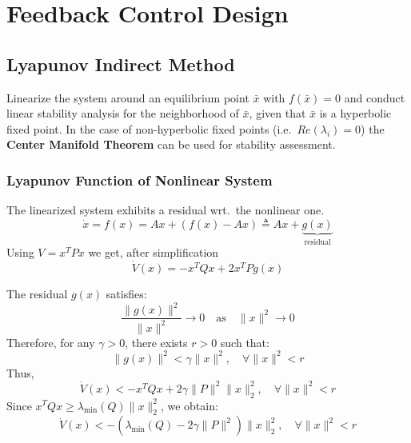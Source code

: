 \section{Feedback Control Design}
\subsection{Lyapunov Indirect Method}
Linearize the system around an equilibrium point $\bar{x}$ with $f(\bar{x})=0$ and conduct linear stability analysis for the neighborhood of $\bar{x}$, given that $\bar{x}$ is a hyperbolic fixed point.
\newpar{}
In the case of non-hyperbolic fixed points (i.e.\ $Re(\lambda_i)=0$) the \textbf{Center Manifold Theorem} can be used for stability assessment.

\subsubsection{Lyapunov Function of Nonlinear System}

The linearized system exhibits a residual wrt.\ the nonlinear one.
\begin{equation*}
    \dot{x} = f(x) = Ax + (f(x) - Ax) \triangleq Ax + \underbrace{g(x)}_{\text{residual}}
\end{equation*}
Using $V=x^T P x$ we get, after simplification
\begin{equation*}
    \dot{V}(x) = -x^T Q x + 2x^T P g(x)
\end{equation*}

\newpar{}

The residual $g(x)$ satisfies:
\begin{equation*}
    \frac{\|g(x)\|^2}{\|x\|^2} \to 0 \quad \text{as} \quad \|x\|^2 \to 0
\end{equation*}
Therefore, for any $\gamma > 0$, there exists $r > 0$ such that:
\begin{equation*}
    \|g(x)\|^2 < \gamma \|x\|^2, \quad \forall \|x\|^2 < r
\end{equation*}
Thus,
\begin{equation*}
    \dot{V}(x) < -x^T Q x + 2 \gamma \|P\|^2 \|x\|^2_2, \quad \forall \|x\|^2 < r
\end{equation*}
Since $x^T Q x \geq \lambda_{\min}(Q) \|x\|^2_2$, we obtain:
\begin{equation*}
    \dot{V}(x) < -\left( \lambda_{\min}(Q) - 2 \gamma \|P\|^2 \right) \|x\|^2_2, \quad \forall \|x\|^2 < r
\end{equation*}

